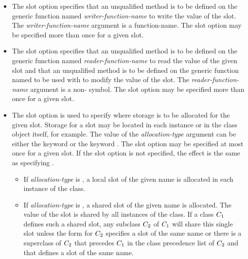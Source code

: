\begin{defmac}
\begin{itemize}
\item  
The  slot option specifies that an unqualified method is
to be defined on the generic function named {\it
writer-function-name\/} to write the value of the slot.  The
\emph{writer-function-name\/} argument is a function-name.
The  slot option may be specified more than once for a
given slot.

\item  
The  slot option specifies that an unqualified method
is to be defined on the generic function named {\it
reader-function-name\/} to read the value of the given slot
and that an unqualified method is to be defined on the generic
function named  to be
used with  to modify the value of the slot.  The {\it
reader-function-name\/} argument is a non- symbol.
The  slot option may be specified more than once for a
given slot.

\item  
The  slot option is used to specify where storage is
to be allocated for the given slot.  Storage for a slot may be located
in each instance or in the class object itself, for example.  The value of the {\it
allocation-type\/} argument can be either the keyword 
or the keyword .  The  slot option may be
specified at most once for a given slot.  If the 
slot option is not specified, the effect is the same as specifying
.

\begin{itemize}
\item
If \emph{allocation-type\/} is , a local slot of the given name
is allocated in each instance of the class.  

\item
If \emph{allocation-type\/} is , a shared slot of the given
name is allocated.  The value of the slot is shared by all instances of the class.
If a class $C_1$ defines such a shared slot, any subclass $C_2$ of
$C_1$ will share this single slot unless the  form
for $C_2$ specifies a slot of the same name or there is a
superclass of $C_2$ that precedes $C_1$ in the class precedence
list of $C_2$ and that defines a slot of the same name.
\end{itemize}


\end{itemize}
\end{defmac}
